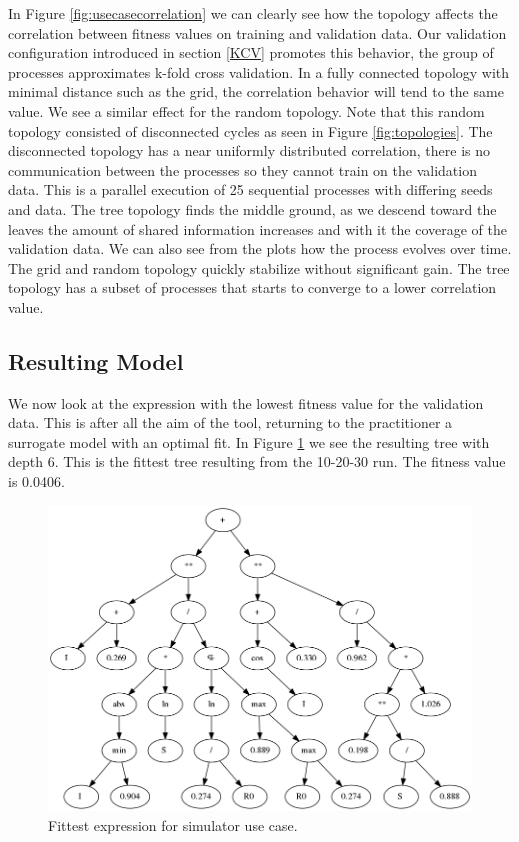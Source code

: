 In Figure \ref{fig:usecasecorrelation} we can clearly see how the topology affects the correlation between fitness values on training and validation data. Our validation configuration introduced in section \ref{KCV} promotes this behavior, the group of processes approximates k-fold cross validation. In a fully connected topology with minimal distance such as the grid, the correlation behavior will tend to the same value. We see a similar effect for the random topology. Note that this random topology consisted of disconnected cycles as seen in Figure \ref{fig:topologies}. The disconnected topology has  a near uniformly distributed correlation, there is no communication between the processes so they cannot train on the validation data. This is a parallel execution of 25 sequential processes with differing seeds and data. The tree topology finds the middle ground, as we descend toward the leaves the amount of shared information increases and with it the coverage of the validation data.
We can also see from the plots how the process evolves over time. The grid and random topology quickly stabilize without significant gain. The tree topology has a subset of processes that starts to converge to a lower correlation value. 

\subsection{Resulting Model}
We now look at the expression with the lowest fitness value for the validation data. This is after all the aim of the tool, returning to the practitioner a surrogate model with an optimal fit. In Figure \ref{fig:bestusecase} we see the resulting tree with depth 6. This is the fittest tree resulting from the 10-20-30 run. The fitness value is 0.0406.
\begin{figure}
    \centering
    \includegraphics[width=\textwidth,height=\textheight,keepaspectratio]{figures/bestusecasesimple.png}
    \caption{Fittest expression for simulator use case.}
    \label{fig:bestusecase}
\end{figure}
